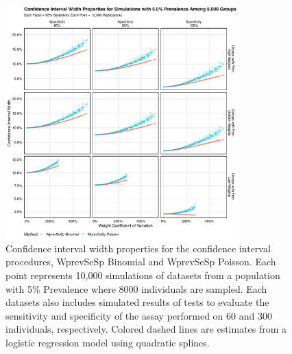 \documentclass[AMA,STIX1COL]{WileyNJD-v2}
\begin{document}
\begin{figure}
\centering
\includegraphics[width=0.8\textwidth]{figures/imperfect_confidence_interval_width_8000_groups_0_05_prev}
\caption{Confidence interval width properties for the confidence interval procedures, WprevSeSp Binomial and WprevSeSp Poisson.
Each point represents 10,000 simulations of datasets from a population with 5\% Prevalence where 8000 individuals are sampled.
Each datasets also includes simulated results of tests to evaluate the sensitivity and specificity of the assay performed on 60 and 300 individuals, respectively.
Colored dashed lines are estimates from a logistic regression model using quadratic splines.}
\label{fig:imperfect_confidence_interval_width_8000_groups_0_05_prev}
\end{figure}
\end{document}
